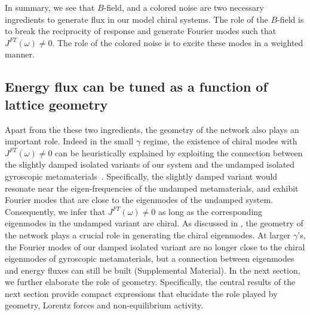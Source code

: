 \documentclass[
 preprint,
 preprintnumbers,
 amsmath,amssymb,
 aps,
 pre,
 longbibliography,
 superscriptaddress,
 10pt, twocolumn
]{revtex4-1}
\begin{document}
In summary, we see that $B$-field, and a colored noise are two necessary ingredients to generate flux in our model chiral systems.
The role of the $B$-field is to break the reciprocity of response and generate Fourier modes such that $J^{FT}(\omega)\neq 0$. The role of the colored noise is to excite these modes in a weighted manner.

\subsection{Energy flux can be tuned as a function of lattice geometry} 
Apart from the these two ingredients, the geometry of the network also plays an important role.
Indeed in the small $\gamma$ regime, the existence of chiral modes with $J^{FT}(\omega)\neq 0$ can be heuristically explained by exploiting the connection between the slightly damped isolated variants of our system and the undamped isolated gyroscopic metamaterials~\cite{Nash2015TopologicalMechanics,Mitchell2018AmorphousTopological}.
Specifically, the slightly damped variant would resonate near the eigen-frequencies of the undamped metamaterials, and exhibit Fourier modes that are close to the eigenmodes of the undamped system. Consequently, we infer that $J^{FT}(\omega)\neq 0$ as long as the corresponding eigenmodes in the undamped variant are chiral. As discussed in  \cite{Nash2015TopologicalMechanics}, the geometry of the network plays a crucial role in generating the chiral eigenmodes.
At larger $\gamma$'s, the Fourier modes of our damped isolated variant are no longer close to the chiral eigenmodes of gyroscopic metamaterials, but a connection between eigenmodes and energy fluxes can still be built (Supplemental Material).
In the next section, we further elaborate the role of geometry. Specifically, the central results of the next section provide compact expressions that elucidate the role played by geometry, Lorentz forces and non-equilibrium activity.

\end{document}
